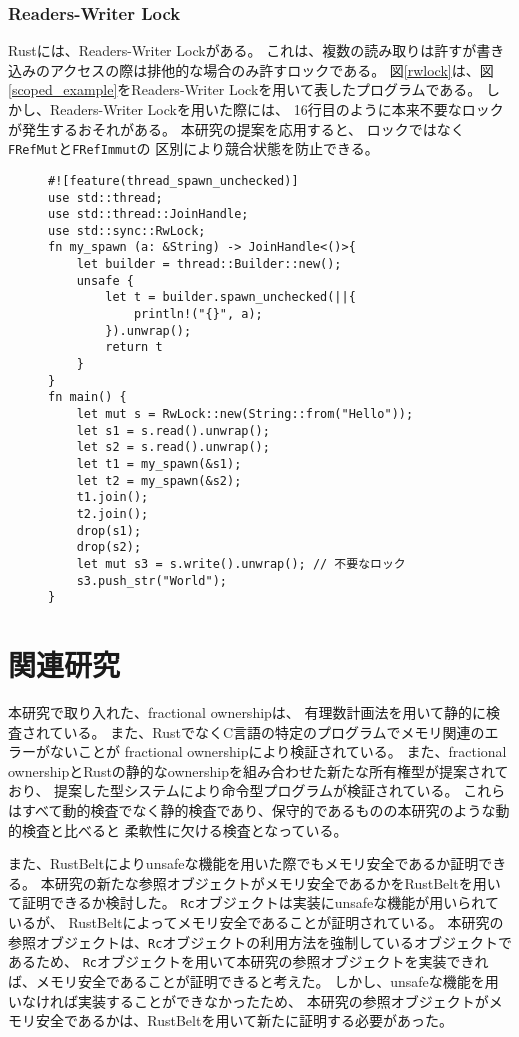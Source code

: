 \documentclass{sumiilab-paper}
\theoremstyle{mystyle}
\numberwithin{definition}{chapter} %
\begin{document}
\subsection{Readers-Writer Lock}
Rustには、Readers-Writer Lock\cite{DBLP:journals/cacm/CouroisHP71}がある。
これは、複数の読み取りは許すが書き込みのアクセスの際は排他的な場合のみ許すロックである。
図\ref{rwlock}は、図\ref{scoped_example}をReaders-Writer Lockを用いて表したプログラムである。
しかし、Readers-Writer Lockを用いた際には、
16行目のように本来不要なロックが発生するおそれがある。
本研究の提案を応用すると、
ロックではなく\texttt{FRefMut}と\texttt{FRefImmut}の
区別により競合状態を防止できる。
\begin{figure}[htp]
\begin{lstlisting}[caption=Readers-Writer Lockを用いた並列処理の例, 
  label=rwlock, captionpos=b]
#![feature(thread_spawn_unchecked)]
use std::thread;
use std::thread::JoinHandle;
use std::sync::RwLock;
fn my_spawn (a: &String) -> JoinHandle<()>{
    let builder = thread::Builder::new();
    unsafe {
        let t = builder.spawn_unchecked(||{
            println!("{}", a);
        }).unwrap();
        return t
    }
}
fn main() {
    let mut s = RwLock::new(String::from("Hello"));
    let s1 = s.read().unwrap();
    let s2 = s.read().unwrap();
    let t1 = my_spawn(&s1);
    let t2 = my_spawn(&s2); 
    t1.join();
    t2.join();
    drop(s1);
    drop(s2);
    let mut s3 = s.write().unwrap(); // 不要なロック
    s3.push_str("World");
}
\end{lstlisting}
\end{figure}

\chapter{関連研究}
本研究で取り入れた、fractional ownership\cite{DBLP:conf/sas/Boyland03}は、
有理数計画法を用いて静的に検査されている。
また、RustでなくC言語の特定のプログラムでメモリ関連のエラーがないことが
fractional ownershipにより検証されている\cite{10.1007/978-3-642-10672-9_11}。
また、fractional ownershipとRustの静的なownershipを組み合わせた新たな所有権型が提案されており、
提案した型システムにより命令型プログラムが検証されている\cite{10.1007/978-3-031-50521-8_11}。
これらはすべて動的検査でなく静的検査であり、保守的であるものの本研究のような動的検査と比べると
柔軟性に欠ける検査となっている。

また、RustBelt\cite{DBLP:journals/pacmpl/0002JKD18}によりunsafeな機能を用いた際でもメモリ安全であるか証明できる。
本研究の新たな参照オブジェクトがメモリ安全であるかをRustBeltを用いて証明できるか検討した。
\texttt{Rc}オブジェクトは実装にunsafeな機能が用いられているが、
RustBeltによってメモリ安全であることが証明されている。
本研究の参照オブジェクトは、\texttt{Rc}オブジェクトの利用方法を強制しているオブジェクトであるため、
\texttt{Rc}オブジェクトを用いて本研究の参照オブジェクトを実装できれば、メモリ安全であることが証明できると考えた。
しかし、unsafeな機能を用いなければ実装することができなかったため、
本研究の参照オブジェクトがメモリ安全であるかは、RustBeltを用いて新たに証明する必要があった。
\end{document}
